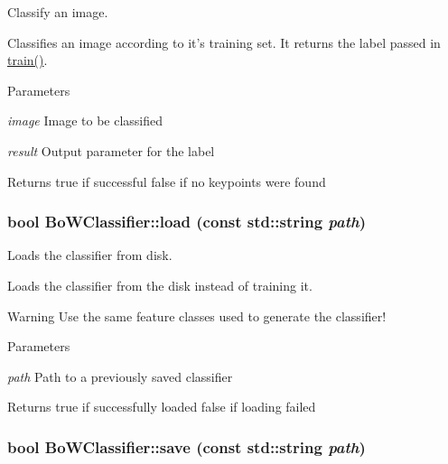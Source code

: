 Classify an image. 

Classifies an image according to it's training set. It returns the label passed in \hyperlink{classBoWClassifier_a895b3766f5600533aa08632e42653dcb}{train()}.


\begin{DoxyParams}{Parameters}
\item[{\em image}]Image to be classified \item[{\em result}]Output parameter for the label \end{DoxyParams}
\begin{DoxyReturn}{Returns}
true if successful false if no keypoints were found 
\end{DoxyReturn}
\hypertarget{classBoWClassifier_a4c8902d5cca6991f9099a6486b124579}{
\subsubsection[{load}]{\setlength{\rightskip}{0pt plus 5cm}bool BoWClassifier::load (const std::string {\em path})}}
\label{classBoWClassifier_a4c8902d5cca6991f9099a6486b124579}


Loads the classifier from disk. 

Loads the classifier from the disk instead of training it.

\begin{DoxyWarning}{Warning}
Use the same feature classes used to generate the classifier!
\end{DoxyWarning}

\begin{DoxyParams}{Parameters}
\item[{\em path}]Path to a previously saved classifier \end{DoxyParams}
\begin{DoxyReturn}{Returns}
true if successfully loaded false if loading failed 
\end{DoxyReturn}
\hypertarget{classBoWClassifier_ae563c9386e11fd8a171d28972d48dd16}{
\subsubsection[{save}]{\setlength{\rightskip}{0pt plus 5cm}bool BoWClassifier::save (const std::string {\em path})}}
\label{classBoWClassifier_ae563c9386e11fd8a171d28972d48dd16}


